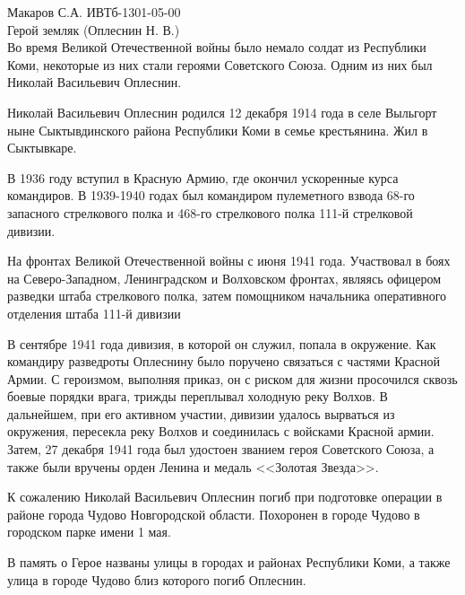 \documentclass[a4paper,14pt]{extarticle}
\begin{document}
	\pagestyle{empty}
	\noindent Макаров С.А. ИВТб-1301-05-00 \\
	Герой земляк (Оплеснин Н. В.) \\
	
	Во время Великой Отечественной войны было немало солдат из Республики Коми, некоторые из них стали героями Советского Союза. Одним из них был Николай Васильевич Оплеснин.
	
	Николай Васильевич Оплеснин родился 12 декабря 1914 года в селе Выльгорт ныне Сыктывдинского района Республики Коми в семье крестьянина. Жил в Сыктывкаре.
	
	В 1936 году вступил в Красную Армию, где окончил ускоренные курса командиров. В 1939-1940 годах был командиром пулеметного взвода 68-го запасного стрелкового полка и 468-го стрелкового полка 111-й стрелковой дивизии.
	
	На фронтах Великой Отечественной войны с июня 1941 года. Участвовал в боях на Северо-Западном, Ленинградском и Волховском фронтах, являясь офицером разведки штаба стрелкового полка, затем помощником начальника оперативного отделения штаба 111-й дивизии
	
	В сентябре 1941 года дивизия, в которой он служил, попала в окружение. Как командиру разведроты Оплеснину было поручено связаться с частями Красной Армии. С героизмом, выполняя приказ, он с риском для жизни просочился сквозь боевые порядки врага, трижды переплывал холодную реку Волхов. В дальнейшем, при его активном участии, дивизии удалось вырваться из окружения, пересекла реку Волхов и соединилась с войсками Красной армии. Затем, 27 декабря 1941 года был удостоен званием героя Советского Союза, а также были вручены орден Ленина и медаль <<Золотая Звезда>>.
	
	К сожалению Николай Васильевич Оплеснин погиб при подготовке операции в районе города Чудово Новгородской области. Похоронен в городе Чудово в городском парке имени 1 мая. 
	
	В память о Герое названы улицы в городах и районах Республики Коми, а также улица в городе Чудово близ которого погиб Оплеснин.
\end{document}
